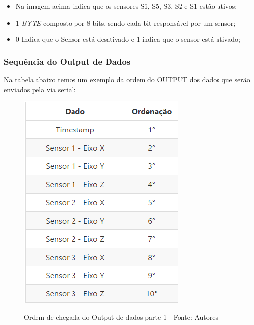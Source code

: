 \begin{itemize}
  \item Na imagem acima indica que os sensores S6, S5, S3, S2 e S1 estão ativos;
  \item 1 \textit{BYTE} composto por 8 bits, sendo cada bit responsável por um sensor;
  \item 0 Indica que o Sensor está desativado e 1 indica que o sensor está ativado;
\end{itemize}

\subsubsection*{Sequência do Output de Dados}

Na tabela abaixo temos um exemplo da ordem do OUTPUT dos dados que serão enviados pela via serial:

\begin{figure}[H]
\centering
\includegraphics[keepaspectratio=true,scale=0.8]{figuras/ordem_envio_1.png}
\label{fig:envio_1}
\caption{Ordem de chegada do Output de dados parte 1 - Fonte: Autores}
\end{figure}

